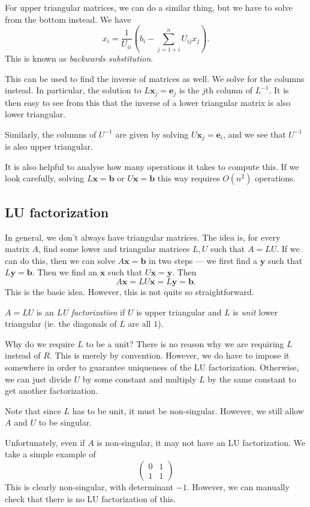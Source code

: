 \documentclass[a4paper]{article}
\begin{document}
For upper triangular matrices, we can do a similar thing, but we have to solve from the bottom instead. We have
\[
  x_i = \frac{1}{U_{ii}} \left(b_i - \sum_{j = 1 + i}^n U_{ij} x_j\right).
\]
This is known as \emph{backwards substitution}.

This can be used to find the inverse of matrices as well. We solve for the columns instead. In particular, the solution to $L \mathbf{x}_j = \mathbf{e}_j$ is the $j$th column of $L^{-1}$. It is then easy to see from this that the inverse of a lower triangular matrix is also lower triangular.

Similarly, the columns of $U^{-1}$ are given by solving $U\mathbf{x}_j = \mathbf{e}_i$, and we see that $U^{-1}$ is also upper triangular.

It is also helpful to analyse how many operations it takes to compute this. If we look carefully, solving $L\mathbf{x} =\mathbf{b}$ or $U\mathbf{x} = \mathbf{b}$ this way requires $O(n^2)$ operations.

\subsection{LU factorization}
In general, we don't always have triangular matrices. The idea is, for every matrix $A$, find some lower and triangular matrices $L, U$ such that $A = LU$. If we can do this, then we can solve $A\mathbf{x} = \mathbf{b}$ in two steps --- we first find a $\mathbf{y}$ such that $L\mathbf{y} = \mathbf{b}$. Then we find an $\mathbf{x}$ such that $U\mathbf{x} = \mathbf{y}$. Then
\[
  A\mathbf{x} = LU\mathbf{x} = L\mathbf{y} = \mathbf{b}.
\]
This is the basic idea. However, this is not quite so straightforward.

\begin{defi}[LU factorization]
  $A = LU$ is an \emph{LU factorization} if $U$ is upper triangular and $L$ is \emph{unit} lower triangular (ie. the diagonals of $L$ are all $1$).
\end{defi}
Why do we require $L$ to be a unit? There is no reason why we are requiring $L$ instead of $R$. This is merely by convention. However, we do have to impose it somewhere in order to guarantee uniqueness of the LU factorization. Otherwise, we can just divide $U$ by some constant and multiply $L$ by the same constant to get another factorization.

Note that since $L$ has to be unit, it must be non-singular. However, we still allow $A$ and $U$ to be singular.

Unfortunately, even if $A$ is non-singular, it may not have an LU factorization. We take a simple example of
\[
  \begin{pmatrix}
    0 & 1\\
    1 & 1
  \end{pmatrix}
\]
This is clearly non-singular, with determinant $-1$. However, we can manually check that there is no LU factorization of this.
\end{document}
